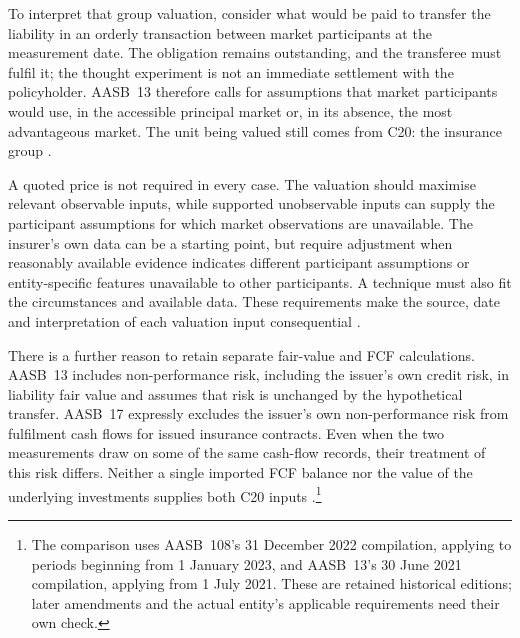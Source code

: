 To interpret that group valuation, consider what would be paid to transfer
the liability in an orderly transaction between market participants at the
measurement date. The obligation remains outstanding, and the transferee must
fulfil it; the thought experiment is not an immediate settlement with the
policyholder. AASB~13 therefore calls for assumptions that market participants
would use, in the accessible principal market or, in its absence, the most
advantageous market. The unit being valued still comes from C20: the insurance
group \citep[paragraphs~2--3, 9, 13--24 and 34]{aasb13comp2021}.

A quoted price is not required in every case. The valuation should maximise
relevant observable inputs, while supported unobservable inputs can supply
the participant assumptions for which market observations are unavailable.
The insurer's own data can be a starting point, but require adjustment when
reasonably available evidence indicates different participant assumptions or
entity-specific features unavailable to other participants. A technique must
also fit the circumstances and available data. These requirements make the
source, date and interpretation of each valuation input consequential
\citep[paragraphs~61--67 and 87--89]{aasb13comp2021}.

There is a further reason to retain separate fair-value and FCF calculations.
AASB~13 includes non-performance risk, including the issuer's own credit
risk, in liability fair value and assumes that risk is unchanged by the
hypothetical transfer. AASB~17 expressly excludes the issuer's own
non-performance risk from fulfilment cash flows for issued insurance contracts.
Even when the two measurements draw on some of the same cash-flow records,
their treatment of this risk differs. Neither a single imported FCF balance
nor the value of the underlying investments supplies both C20 inputs
\citep[paragraphs~42--44]{aasb13comp2021}
\citep[paragraph~31]{aasb17}.\footnote{The comparison uses AASB~108's
31 December 2022 compilation, applying to periods beginning from 1 January
2023, and AASB~13's 30 June 2021 compilation, applying from 1 July 2021.
These are retained historical editions; later amendments and the actual
entity's applicable requirements need their own check.}
